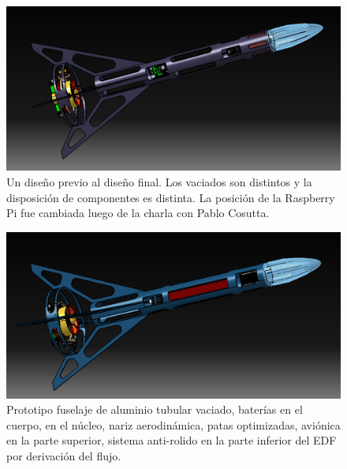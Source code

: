 \begin{figure}[htb]
    \centering
    \includegraphics[width=\linewidth]{fig/design/4}
    \caption{Un diseño previo al diseño final. Los vaciados son distintos y la disposición de componentes es distinta. La posición de la Raspberry Pi fue cambiada luego de la charla con Pablo Cosutta.}
    \label{fig:design/4}
\end{figure}

\begin{figure}[htb]
    \centering
    \includegraphics[width=\linewidth]{fig/design/5}
    \caption{Prototipo fuselaje de aluminio tubular vaciado, baterías en el cuerpo, en el núcleo, nariz aerodinámica, patas optimizadas, aviónica en la parte superior, sistema anti-rolido en la parte
    inferior del EDF por derivación del flujo.}
    \label{fig:design/5}
\end{figure}

\null\newpage
\clearpage
